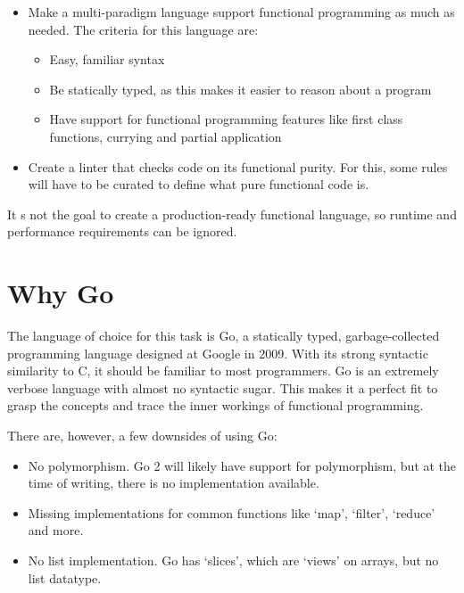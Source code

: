 \begin{itemize}
    \item Make a multi-paradigm language support functional programming as much as needed.
        The criteria for this language are:
    \begin{itemize}
        \item Easy, familiar syntax
        \item Be statically typed, as this makes it easier to reason about a program
        \item Have support for functional programming features like first class functions, currying
            and partial application
    \end{itemize}
    \item Create a linter that checks code on its functional purity. For this, some rules will have
        to be curated to define what pure functional code is.
\end{itemize}

It s not the goal to create a production-ready functional language, so runtime and performance requirements
can be ignored.

\section{Why Go}

The language of choice for this task is Go, a statically typed, garbage-collected programming language
designed at Google in 2009\autocite{golang-publish}. With its strong syntactic similarity to C, it should
be familiar to most programmers.
Go is an extremely verbose language with almost no syntactic sugar. This makes it a perfect fit to
grasp the concepts and trace the inner workings of functional programming.

There are, however, a few downsides of using Go:

\begin{itemize}
    \item No polymorphism. Go 2 will likely have support for polymorphism, but at the time of writing,
        there is no implementation available.
    \item Missing implementations for common functions like `map', `filter', `reduce' and more.
    \item No list implementation. Go has `slices', which are `views' on arrays, but
        no list datatype.
\end{itemize}

